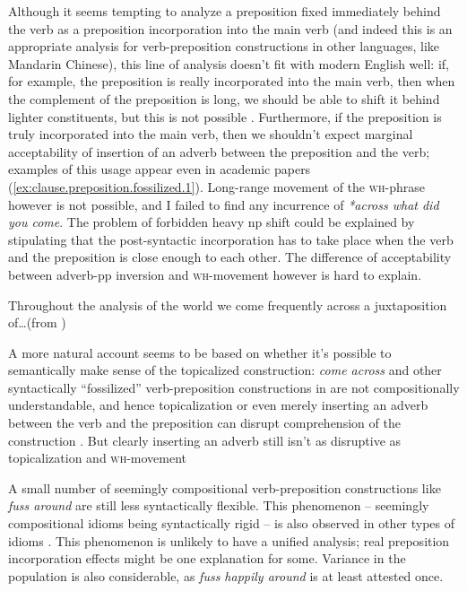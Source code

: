 \documentclass[UTF8, a4paper, oneside, scheme=plain, 12pt]{ctexbook}
\newcommand*{\citesec}[1]{\S~{#1}}
\newcommand*{\citepage}[1]{p.~{#1}}
\newcommand{\form}[1]{\emph{#1}}
\newcommand{\category}[1]{\textsc{#1}}
\begin{document}
Although it seems tempting to analyze a preposition fixed immediately behind the verb as 
a preposition incorporation into the main verb
(and indeed this is an appropriate analysis for verb-preposition constructions in other languages, 
like Mandarin Chinese), 
this line of analysis doesn't fit with modern English well: 
if, for example, the preposition is really incorporated into the main verb, 
then when the complement of the preposition is long, 
we should be able to shift it behind lighter constituents, 
but this is not possible \citep[\citepage{277}]{cgel}.
Furthermore, if the preposition is truly incorporated into the main verb,
then we shouldn't expect marginal acceptability of 
insertion of an adverb between the preposition and the verb;
examples of this usage appear even in academic papers 
(\ref{ex:clause.preposition.fossilized.1}).
Long-range movement of the \category{wh}-phrase however is not possible, 
and I failed to find any incurrence of \form{*across what did you come}.
The problem of forbidden heavy \acs{np} shift  
could be explained by stipulating that 
the post-syntactic incorporation has to take place 
when the verb and the preposition is close enough to each other.
The difference of acceptability between adverb-\acs{pp} inversion 
and \category{wh}-movement however is hard to explain.


\begin{exe}
    \ex\label{ex:clause.preposition.fossilized.1} Throughout the analysis of the world we come frequently across a
    juxtaposition of\dots (from \citet{biemel1980development})
\end{exe}


A more natural account seems to be based on whether it's possible 
to semantically make sense of the topicalized construction: 
\form{come across} and other syntactically ``fossilized'' verb-preposition constructions 
in \citet[\citepage{278}]{cgel} 
are not compositionally understandable, 
and hence topicalization or even merely inserting an adverb between the verb and the preposition
can disrupt comprehension of the construction \citep{nediger2017unifying}.
But clearly inserting an adverb still isn't as disruptive as topicalization and \category{wh}-movement 

A small number of seemingly compositional verb-preposition constructions like \form{fuss around} 
are still less syntactically flexible.
This phenomenon -- seemingly compositional idioms being syntactically rigid -- 
is also observed in other types of idioms \citep[\citesec{5.7.2}]{nediger2017unifying}.
This phenomenon is unlikely to have a unified analysis; 
real preposition incorporation effects might be one explanation for some.
Variance in the population is also considerable, 
as \form{fuss happily around} is at least attested once.
\end{document}

